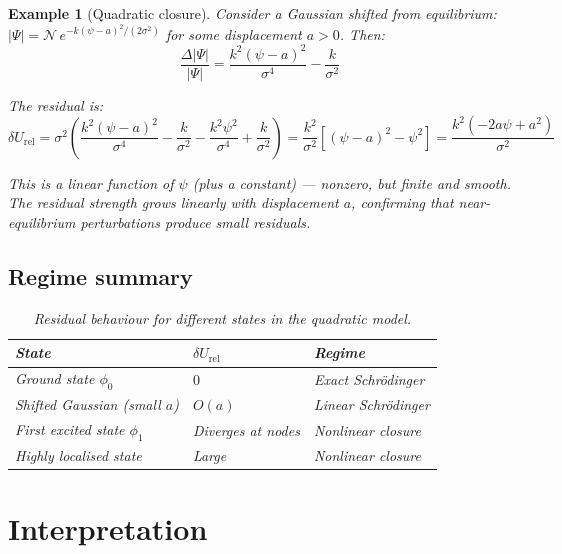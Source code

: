 \documentclass[12pt]{article}
\newtheorem{example}[theorem]{Example}
\newcommand{\dUrel}{\delta U_{\mathrm{rel}}}
\begin{document}
\begin{example}[Quadratic closure]
Consider a Gaussian shifted from equilibrium: $|\Psi| = \mathcal{N}\,e^{-k(\psi - a)^2/(2\sigma^2)}$ for some displacement $a > 0$. Then:
\begin{equation}
    \frac{\Delta|\Psi|}{|\Psi|} = \frac{k^2(\psi-a)^2}{\sigma^4} - \frac{k}{\sigma^2}
\end{equation}

The residual is:
\begin{equation}
    \dUrel = \sigma^2\left(\frac{k^2(\psi-a)^2}{\sigma^4} - \frac{k}{\sigma^2} - \frac{k^2\psi^2}{\sigma^4} + \frac{k}{\sigma^2}\right) = \frac{k^2}{\sigma^2}\left[(\psi-a)^2 - \psi^2\right] = \frac{k^2(-2a\psi + a^2)}{\sigma^2}
\end{equation}

This is a linear function of $\psi$ (plus a constant) --- nonzero, but finite and smooth. The residual strength grows linearly with displacement $a$, confirming that near-equilibrium perturbations produce small residuals.

\subsection*{Regime summary}

\begin{table}[ht]
\centering
\caption{Residual behaviour for different states in the quadratic model.}
\label{tab:states}
\begin{tabular}{@{}lll@{}}
\toprule
State & $\dUrel$ & Regime \\
\midrule
Ground state $\phi_0$ & $0$ & Exact Schr\"odinger \\
Shifted Gaussian (small $a$) & $O(a)$ & Linear Schr\"odinger \\
First excited state $\phi_1$ & Diverges at nodes & Nonlinear closure \\
Highly localised state & Large & Nonlinear closure \\
\bottomrule
\end{tabular}
\end{table}

\end{example}

\section{Interpretation}\label{sec:interpretation}
\end{document}
